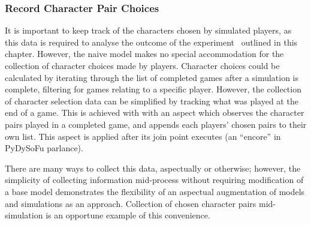 
\subsubsection{Record Character Pair Choices}
It is important to keep track of the characters chosen by simulated players, as
this data is required to analyse the outcome of the experiment~ outlined in this chapter. However,
the naive model makes no special accommodation for the collection of character
choices made by players. Character choices could be calculated by iterating
through the list of completed games after a simulation is complete, filtering
for games relating to a specific player. However, the collection of character
selection data can be simplified by tracking what was played at the end of a
game. This is achieved with with an aspect which observes the character pairs
played in a completed game, and appends each players' chosen pairs to their own
list. This aspect is applied after its join point executes (an ``encore'' in
PyDySoFu parlance).

There are many ways to collect this data, aspectually or otherwise; however, the
simplicity of collecting information mid-process without requiring modification
of a base model demonstrates the flexibility of an aspectual augmentation of
models and simulations as an approach. Collection of chosen character pairs
mid-simulation is an opportune example of this convenience.

